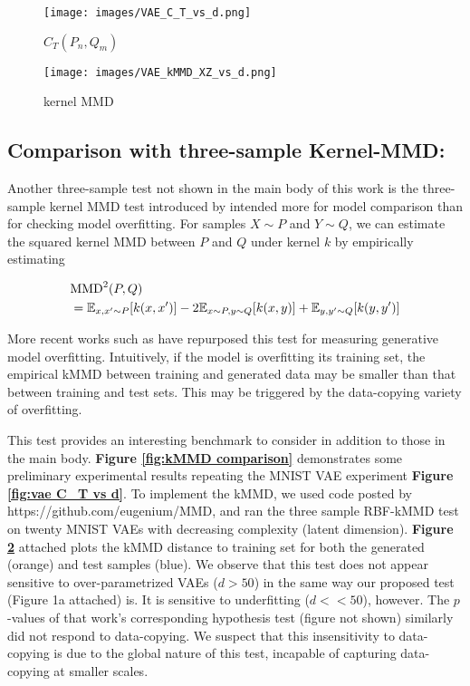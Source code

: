 \begin{figure*}[h]
    \centering
    \begin{subfigure}{0.49\linewidth}
        \centering
        \texttt{[image: images/VAE\_C\_T\_vs\_d.png]}
        \caption{$C_T(P_n, Q_m)$}
        \label{fig:kMMD comparison vae}
    \end{subfigure}
    \hfill
    \begin{subfigure}{0.49\linewidth}
        \centering
        \texttt{[image: images/VAE\_kMMD\_XZ\_vs\_d.png]}
        \caption{kernel MMD}
        \label{fig:kMMD comparison kMMD}
    \end{subfigure}
    \caption{Comparison of the $C_T(P_n, Q_m)$ test presented in this paper alongside the three sample kMMD test. }
    \label{fig:kMMD comparison}
\end{figure*}

\subsection{Comparison with three-sample Kernel-MMD:}
Another three-sample test not shown in the main body of this work is the three-sample kernel MMD test introduced by \cite{gretton_2} intended more for model comparison than for checking model overfitting. For samples $X \sim P$ and $Y \sim Q$, we can estimate the squared kernel MMD between $P$ and $Q$ under kernel $k$ by empirically estimating 

\begin{align*}
    &\text{MMD}^2(P,Q) \\
    &= {\mathbb E}_{x,x' \sim P}[k(x,x')] - 2{\mathbb E}_{x\sim P, y \sim Q}[k(x,y)] +  {\mathbb E}_{y,y' \sim Q}[k(y,y')]
\end{align*}

More recent works such as \cite{reviewer_paper} have repurposed this test for measuring generative model overfitting. Intuitively, if the model is overfitting its training set, the empirical kMMD between training and generated data may be smaller than that between training and test sets. This may be triggered by the data-copying variety of overfitting. 

This test provides an interesting benchmark to consider in addition to those in the main body. \textbf{Figure \ref{fig:kMMD comparison}} demonstrates some preliminary experimental results repeating the MNIST VAE experiment \textbf{Figure \ref{fig:vae C_T vs d}}. To implement the kMMD, we used code posted by \cite{gretton_2} https://github.com/eugenium/MMD, and ran the three sample RBF-kMMD test on twenty MNIST VAEs with decreasing complexity (latent dimension). \textbf{Figure \ref{fig:kMMD comparison kMMD}} attached plots the kMMD distance to training set for both the generated (orange) and test samples (blue). We observe that this test does not appear sensitive to over-parametrized VAEs ($d > 50$) in the same way our proposed test (Figure 1a attached) is. It is sensitive to underfitting ($d << 50$), however. The $p$-values of that work's corresponding hypothesis test (figure not shown) similarly did not respond to data-copying.
We suspect that this insensitivity to data-copying is due to the global nature of this test, incapable of capturing data-copying at smaller scales. 
